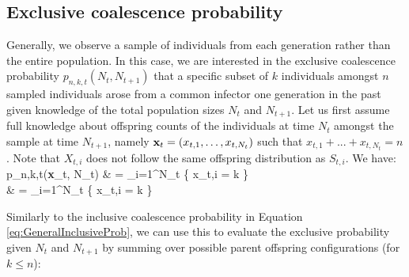 \documentclass{article}
\let\oldalign\align
\let\oldendalign\endalign
\renewenvironment{align}{\linenomathNonumbers\oldalign}{\oldendalign\endlinenomath}
\renewcommand{\eqref}[1]{\ref{#1}}
\begin{document}
\subsection{Exclusive coalescence probability}

Generally, we observe a sample of individuals from each generation rather than the entire population.
In this case, we are interested in the exclusive coalescence probability $p_{n,k,t}(N_t, N_{t+1})$ that a specific subset of $k$ individuals amongst $n$ sampled individuals arose from a common infector one generation in the past given knowledge of the total population sizes $N_t$ and $N_{t+1}$.
%
Let us first assume full knowledge about offspring counts of the individuals at time $N_t$ amongst the sample at time $N_{t+1}$, namely ${\bf x}_t = (x_{t,1}, \dots, x_{t,N_t})$ such that $x_{t,1}+...+x_{t,N_t}=n$. 
Note that $X_{t,i}$ does not follow the same offspring distribution as $S_{t,i}$. We have:
	\begin{align}
		p_{n,k,t}({\bf x}_t, N_t)
			& = \sum_{i=1}^{N_t}   \{ x_{t,i} = k \}\nonumber\\
			& = \sum_{i=1}^{N_t}    \{ x_{t,i} = k \}
	\end{align}

Similarly to the inclusive coalescence probability in Equation \eqref{eq:GeneralInclusiveProb}, we can use this to evaluate the exclusive probability given $N_t$ and $N_{t+1}$ by summing over possible parent offspring configurations (for $k \leq n$):
\end{document}
